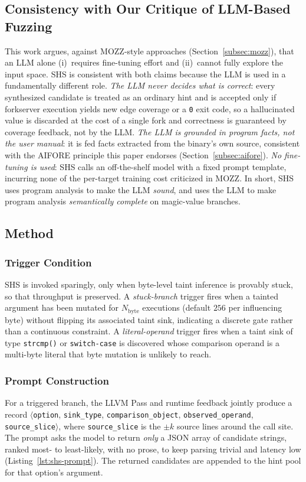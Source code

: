 \subsection{Consistency with Our Critique of LLM-Based Fuzzing}
This work argues, against MOZZ-style approaches (Section~\ref{subsec:mozz}), that an LLM alone (i)~requires fine-tuning effort and (ii)~cannot fully explore the input space. SHS is consistent with both claims because the LLM is used in a fundamentally different role. \emph{The LLM never decides what is correct}: every synthesized candidate is treated as an ordinary hint and is accepted only if forkserver execution yields new edge coverage or a \texttt{0} exit code, so a hallucinated value is discarded at the cost of a single fork and correctness is guaranteed by coverage feedback, not by the LLM. \emph{The LLM is grounded in program facts, not the user manual}: it is fed facts extracted from the binary's own source, consistent with the AIFORE principle this paper endorses (Section~\ref{subsec:aifore}). \emph{No fine-tuning is used}: SHS calls an off-the-shelf model with a fixed prompt template, incurring none of the per-target training cost criticized in MOZZ. In short, SHS uses program analysis to make the LLM \emph{sound}, and uses the LLM to make program analysis \emph{semantically complete} on magic-value branches.

\subsection{Method}
\subsubsection{Trigger Condition}
SHS is invoked sparingly, only when byte-level taint inference is provably stuck, so that throughput is preserved. A \emph{stuck-branch} trigger fires when a tainted argument has been mutated for $N_{\mathrm{byte}}$ executions (default $256$ per influencing byte) without flipping its associated taint sink, indicating a discrete gate rather than a continuous constraint. A \emph{literal-operand} trigger fires when a taint sink of type \texttt{strcmp()} or \texttt{switch-case} is discovered whose comparison operand is a multi-byte literal that byte mutation is unlikely to reach.

\subsubsection{Prompt Construction}
For a triggered branch, the LLVM Pass and runtime feedback jointly produce a record $\langle$\texttt{option}, \texttt{sink\_type}, \texttt{comparison\_object}, \texttt{observed\_operand}, \texttt{source\_slice}$\rangle$, where \texttt{source\_slice} is the $\pm k$ source lines around the call site. The prompt asks the model to return \emph{only} a JSON array of candidate strings, ranked most- to least-likely, with no prose, to keep parsing trivial and latency low (Listing~\ref{lst:shs-prompt}). The returned candidates are appended to the hint pool for that option's argument.

